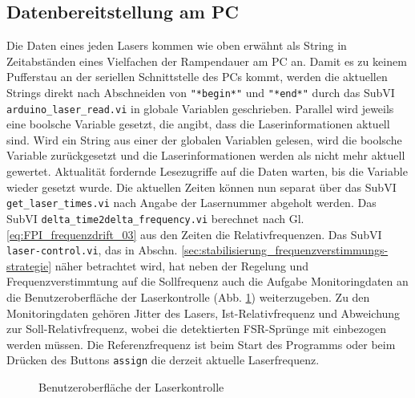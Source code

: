 \subsection{Datenbereitstellung am PC}\label{subsec:datenbereitstellung}
Die Daten eines jeden Lasers kommen wie oben erwähnt als String in Zeitabständen
eines Vielfachen der Rampendauer am PC an. Damit es zu keinem Pufferstau an
der seriellen Schnittstelle des PCs kommt, werden die aktuellen Strings direkt
nach Abschneiden von \lstinline|"*begin*"| und \lstinline|"*end*"| durch das
SubVI \lstinline|arduino_laser_read.vi| in globale Variablen geschrieben.
Parallel wird jeweils eine boolsche Variable gesetzt, die angibt, dass die Laserinformationen aktuell sind. Wird ein String aus einer der
globalen Variablen gelesen, wird die boolsche Variable zurückgesetzt und die
Laserinformationen werden als nicht mehr aktuell gewertet. Aktualität fordernde
Lesezugriffe auf die Daten warten, bis die Variable wieder gesetzt wurde. Die
aktuellen Zeiten können nun separat über das SubVI
\lstinline|get_laser_times.vi| nach Angabe der Lasernummer abgeholt werden. Das SubVI \lstinline|delta_time2delta_frequency.vi| berechnet nach Gl. \eqref{eq:FPI_frequenzdrift_03} aus den Zeiten die
Relativfrequenzen. Das SubVI \lstinline|laser-control.vi|, das in Abschn.
\ref{sec:stabilisierung_frequenzverstimmungs-strategie} näher betrachtet wird, hat neben der Regelung und Frequenzverstimmtung auf die Sollfrequenz auch die Aufgabe
Monitoringdaten an die Benutzeroberfläche der Laserkontrolle (Abb.
\ref{fig:benutzeroberflaeche_laserkontrolle}) weiterzugeben. Zu den
Monitoringdaten gehören Jitter des Lasers, Ist-Relativfrequenz und Abweichung
zur Soll-Relativfrequenz, wobei die detektierten FSR-Sprünge mit einbezogen
werden müssen. Die Referenzfrequenz ist beim Start des Programms oder beim
Drücken des Buttons \lstinline|assign| die derzeit aktuelle Laserfrequenz.
\begin{figure}[hp]
 	\centering
	\caption[Benutzeroberfläche -
	Laserkontrolle]{Benutzeroberfläche
	der Laserkontrolle}\label{fig:benutzeroberflaeche_laserkontrolle}
\end{figure}

